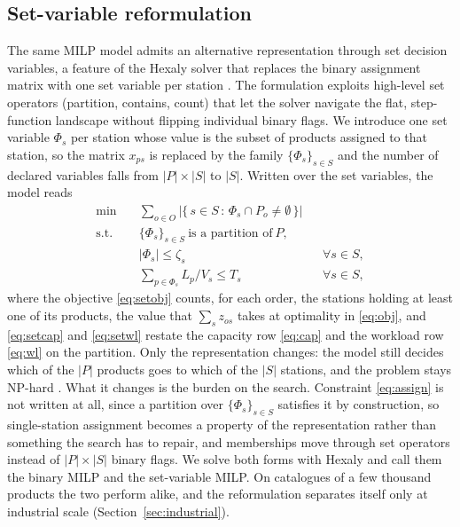 \documentclass[]{interact}
\begin{document}
\subsection{Set-variable reformulation}\label{sec:setvar}
The same MILP model admits an alternative representation through set decision variables, a feature of the Hexaly solver that replaces the binary assignment matrix with one set variable per station \citep{blaisemodeling}. The formulation exploits high-level set operators (partition, contains, count) that let the solver navigate the flat, step-function landscape without flipping individual binary flags. We introduce one set variable $\Phi_s$ per station whose value is the subset of products assigned to that station, so the matrix $x_{ps}$ is replaced by the family $\{\Phi_s\}_{s \in S}$ and the number of declared variables falls from $|P|\times|S|$ to $|S|$. Written over the set variables, the model reads
\begin{align}
\min \quad & \sum_{o \in O} \bigl|\{\, s \in S \,:\, \Phi_s \cap P_o \neq \emptyset \,\}\bigr| \label{eq:setobj}\\
\text{s.t.} \quad & \{\Phi_s\}_{s \in S}\ \text{is a partition of}\ P, \label{eq:setpart}\\
& |\Phi_s| \le \zeta_s && \forall s \in S, \label{eq:setcap}\\
& \sum_{p \in \Phi_s} L_p / V_s \le T_s && \forall s \in S, \label{eq:setwl}
\end{align}
where the objective \eqref{eq:setobj} counts, for each order, the stations holding at least one of its products, the value that $\sum_{s} z_{os}$ takes at optimality in \eqref{eq:obj}, and \eqref{eq:setcap} and \eqref{eq:setwl} restate the capacity row \eqref{eq:cap} and the workload row \eqref{eq:wl} on the partition. Only the representation changes: the model still decides which of the $|P|$ products goes to which of the $|S|$ stations, and the problem stays NP-hard \citep{garey1979computers}. What it changes is the burden on the search. Constraint \eqref{eq:assign} is not written at all, since a partition over $\{\Phi_s\}_{s \in S}$ satisfies it by construction, so single-station assignment becomes a property of the representation rather than something the search has to repair, and memberships move through set operators instead of $|P|\times|S|$ binary flags. We solve both forms with Hexaly and call them the binary MILP and the set-variable MILP. On catalogues of a few thousand products the two perform alike, and the reformulation separates itself only at industrial scale (Section~\ref{sec:industrial}).
\end{document}
